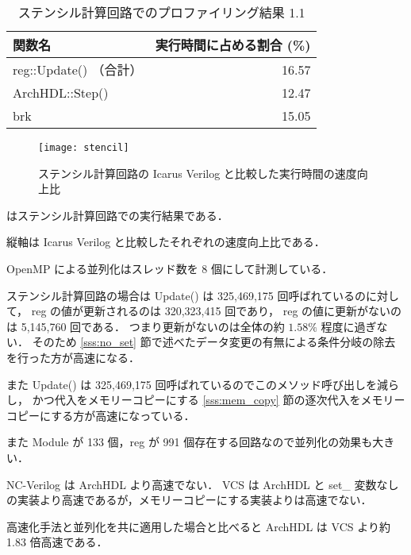 
\begin{table}[t]
 \caption{ステンシル計算回路でのプロファイリング結果 1.1}
 \label{table:stencil_prof1.1}
 \begin{center}
  \begin{tabular}{lr} \toprule
  関数名 & 実行時間に占める割合 (\%) \\ \midrule
  reg::Update() （合計） & 16.57 \\
  ArchHDL::Step() & 12.47 \\
  brk & 15.05 \\ \bottomrule
  \end{tabular}
 \end{center}
\end{table}

\fi

\begin{figure}[t]
 \centering
 \texttt{[image: stencil]}
 \caption{ステンシル計算回路の Icarus Verilog と比較した実行時間の速度向上比}
 \label{fig:stencil}
\end{figure}

 はステンシル計算回路での実行結果である．

縦軸は Icarus Verilog と比較したそれぞれの速度向上比である．

OpenMP による並列化はスレッド数を 8 個にして計測している．

ステンシル計算回路の場合は Update() は 325,469,175 回呼ばれているのに対して，
reg の値が更新されるのは 320,323,415 回であり， reg の値に更新がないのは 5,145,760 回である．
つまり更新がないのは全体の約 $1.58\%$ 程度に過ぎない．
そのため \ref{sss:no_set} 節で述べたデータ変更の有無による条件分岐の除去を行った方が高速になる．

また Update() は 325,469,175 回呼ばれているのでこのメソッド呼び出しを減らし，
かつ代入をメモリーコピーにする \ref{sss:mem_copy} 節の逐次代入をメモリーコピーにする方が高速になっている．

また Module が 133 個，reg が 991 個存在する回路なので並列化の効果も大きい．

NC-Verilog は ArchHDL より高速でない．
VCS は ArchHDL と set\_ 変数なしの実装より高速であるが，メモリーコピーにする実装よりは高速でない．

高速化手法と並列化を共に適用した場合と比べると ArchHDL は VCS より約 1.83 倍高速である．




